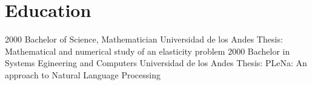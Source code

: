 \section{Education}
\begin{entrylist}
  \entry
    {2000}
    {Bachelor of Science, Mathematician}
    {Universidad de los Andes}
    {Thesis: Mathematical and numerical study of an
    elasticity problem}
  \entry
    {2000}
    {Bachelor in Systems Egineering and Computers}
    {Universidad de los Andes}
    {Thesis: PLeNa: An approach to Natural Language
    Processing}
\end{entrylist}
